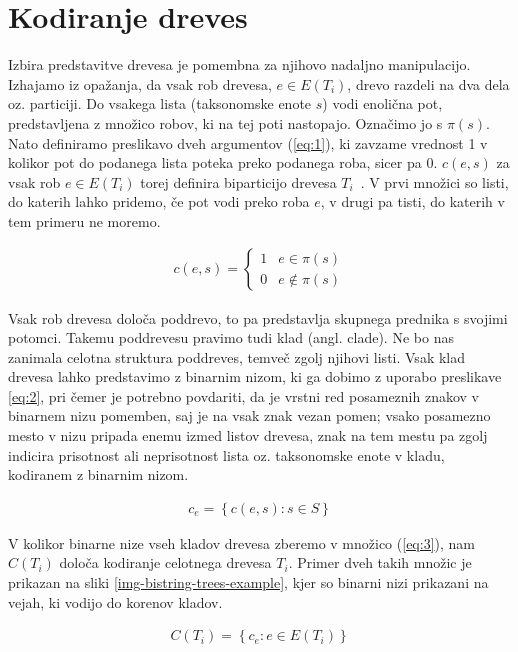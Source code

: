 \documentclass[a4paper, 12pt]{book}
\begin{document}
\section{Kodiranje dreves}
Izbira predstavitve drevesa je pomembna za njihovo nadaljno manipulacijo. Izhajamo iz opažanja, da vsak rob drevesa, $e \in E(T_i)$, drevo razdeli na dva dela oz. particiji. Do vsakega lista (taksonomske enote $s$) vodi enolična pot, predstavljena z množico robov, ki na tej poti nastopajo. Označimo jo s $\pi(s)$. Nato definiramo preslikavo dveh argumentov (\ref{eq:1}), ki zavzame vrednost 1 v kolikor pot do podanega lista poteka preko podanega roba, sicer pa 0. $c(e, s)$ za vsak rob $e \in E(T_i)$ torej definira biparticijo drevesa $T_i$~\cite{pw}. V prvi množici so listi, do katerih lahko pridemo, če pot vodi preko roba $e$, v drugi pa tisti, do katerih v tem primeru ne moremo.

\begin{align}
	c(e, s) = 
	\left\{
		\begin{array}{ll}
			1 & e \in \pi(s) \\
			0 & e \notin \pi(s)
		\end{array}
	\right.
	\label{eq:1}
\end{align}

Vsak rob drevesa določa poddrevo, to pa predstavlja skupnega prednika s svojimi potomci. Takemu poddrevesu pravimo tudi klad (angl. clade). Ne bo nas zanimala celotna struktura poddreves, temveč zgolj njihovi listi. Vsak klad drevesa lahko predstavimo z binarnim nizom, ki ga dobimo z uporabo preslikave \ref{eq:2}, pri čemer je potrebno povdariti, da je vrstni red posameznih znakov v binarnem nizu pomemben, saj je na vsak znak vezan pomen; vsako posamezno mesto v nizu pripada enemu izmed listov drevesa, znak na tem mestu pa zgolj indicira prisotnost ali neprisotnost lista oz. taksonomske enote v kladu, kodiranem z binarnim nizom.


\begin{align}
	c_e = \left\{ c(e, s): s \in S \right\} \label{eq:2}
\end{align}

V kolikor binarne nize vseh kladov drevesa zberemo v množico (\ref{eq:3}), nam $C(T_i)$ določa kodiranje celotnega drevesa $T_i$. Primer dveh takih množic je prikazan na sliki \ref{img-bistring-trees-example}, kjer so binarni nizi prikazani na vejah, ki vodijo do korenov kladov.

\begin{align}
	C(T_i) = \left\{ c_e : e \in E(T_i) \right\} \label{eq:3}
\end{align}
\end{document}
